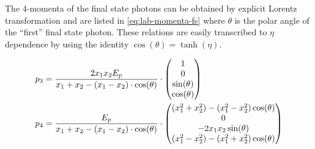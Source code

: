 The 4-momenta of the final state photons can be obtained by explicit
Lorentz transformation and are listed in \cref{eq:lab-momenta-fs}
where \(\theta\) is the polar angle of the ``first'' final state
photon. These relations are easily transcribed to \(\eta\) dependence
by using the identity \(\cos(\theta) = \tanh(\eta)\).

%
\begin{align}
  \label{eq:lab-momenta-fs}
  p_3 &= \frac{2x_1x_2E_p}{x_1+x_2 - (x_1 - x_2)\cdot\cos(\theta)}\cdot
  \mqty(1 \\ 0 \\ \sin(\theta) \\ \cos(\theta)) \\
  p_4 &= \frac{E_p}{x_1+x_2 - (x_1 - x_2)\cdot\cos(\theta)}\cdot
  \mqty((x_1^2+x_2^2) - (x_1^2-x_2^2)\cos(\theta) \\ 0 \\ -2x_1x_2\sin(\theta) \\ (x_1^2-x_2^2) - (x_1^2+x_2^2)\cos(\theta))
\end{align}
%
